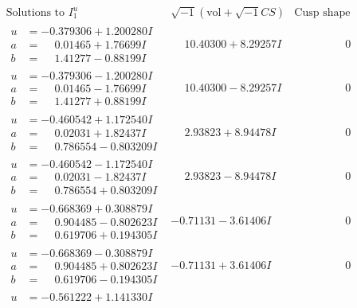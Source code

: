\documentclass[1p]{elsarticle_modified}
\theoremstyle{definition}
\newcommand{\I}{\sqrt{-1}}
\begin{document}
$$\begin{array}{c|c|c}
\text{Solutions to }I^u_{1}& \I (\text{vol} + \sqrt{-1}CS) & \text{Cusp shape}\\
 \hline 
\begin{aligned}
u &= -0.379306 + 1.200280 I \\
a &= \phantom{-}0.01465 + 1.76699 I \\
b &= \phantom{-}1.41277 - 0.88199 I\end{aligned}
 & \phantom{-}10.40300 + 8.29257 I & \phantom{-0.000000 } 0 \\ \hline\begin{aligned}
u &= -0.379306 - 1.200280 I \\
a &= \phantom{-}0.01465 - 1.76699 I \\
b &= \phantom{-}1.41277 + 0.88199 I\end{aligned}
 & \phantom{-}10.40300 - 8.29257 I & \phantom{-0.000000 } 0 \\ \hline\begin{aligned}
u &= -0.460542 + 1.172540 I \\
a &= \phantom{-}0.02031 + 1.82437 I \\
b &= \phantom{-}0.786554 - 0.803209 I\end{aligned}
 & \phantom{-}2.93823 + 8.94478 I & \phantom{-0.000000 } 0 \\ \hline\begin{aligned}
u &= -0.460542 - 1.172540 I \\
a &= \phantom{-}0.02031 - 1.82437 I \\
b &= \phantom{-}0.786554 + 0.803209 I\end{aligned}
 & \phantom{-}2.93823 - 8.94478 I & \phantom{-0.000000 } 0 \\ \hline\begin{aligned}
u &= -0.668369 + 0.308879 I \\
a &= \phantom{-}0.904485 - 0.802623 I \\
b &= \phantom{-}0.619706 + 0.194305 I\end{aligned}
 & -0.71131 - 3.61406 I & \phantom{-0.000000 } 0 \\ \hline\begin{aligned}
u &= -0.668369 - 0.308879 I \\
a &= \phantom{-}0.904485 + 0.802623 I \\
b &= \phantom{-}0.619706 - 0.194305 I\end{aligned}
 & -0.71131 + 3.61406 I & \phantom{-0.000000 } 0 \\ \hline\begin{aligned}
u &= -0.561222 + 1.141330 I \\

\end{aligned}
\end{array}$$
\end{document}
